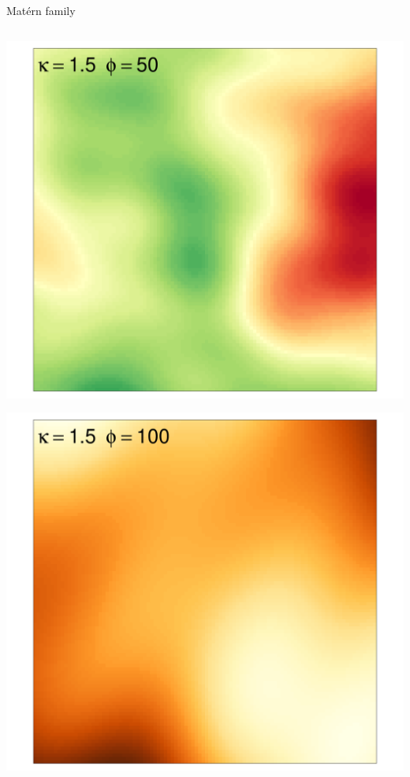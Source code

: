 \documentclass[
  ignorenonframetext,
]{beamer}
\begin{document}
\begin{frame}{Matérn family}
\begin{columns}[T]
\begin{column}{0.33\textwidth}
\includegraphics{Lecture_1_files/figure-beamer/unnamed-chunk-36-1.pdf}

\includegraphics{Lecture_1_files/figure-beamer/unnamed-chunk-37-1.pdf}
\end{column}
\end{columns}
\end{frame}
\end{document}
